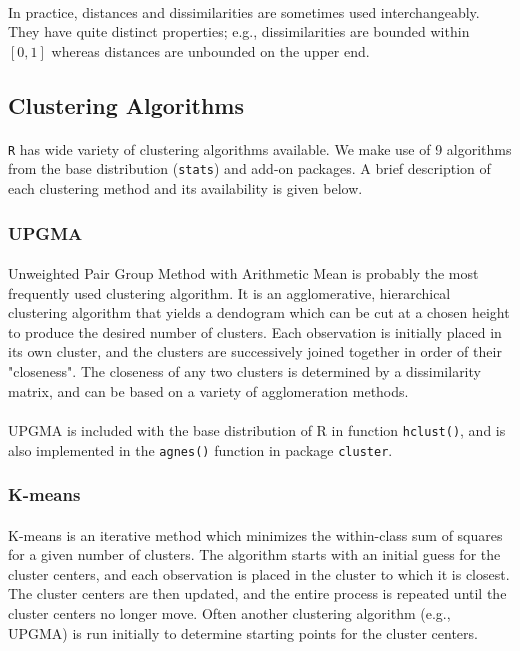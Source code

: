 \documentclass[10pt]{article}\usepackage[]{graphicx}\usepackage[]{color}
\begin{document}
\paragraph{}
In practice, distances and dissimilarities are sometimes used interchangeably. 
They have quite distinct properties; e.g., dissimilarities are bounded within 
$[0,1]$ whereas distances are unbounded on the upper end.



\subsection{Clustering Algorithms}
\paragraph{}
\texttt{R} has wide variety of clustering algorithms available. We make use of 9 
algorithms from the base distribution (\texttt{stats}) and add-on packages. 
A brief description of each clustering method and its availability is given below.

\subsubsection{UPGMA}
\paragraph{}
Unweighted Pair Group Method with Arithmetic Mean is probably the most
frequently used clustering algorithm. It is
an agglomerative, hierarchical clustering algorithm that yields a dendogram
which can be cut at a chosen height to produce the desired number of clusters.
Each observation is initially placed in its own cluster, and the clusters
are successively joined together in order of their "closeness". The closeness
of any two clusters is determined by a dissimilarity matrix, and can be
based on a variety of agglomeration methods. 
\paragraph{}
UPGMA is included with the base distribution of R in function 
\texttt{hclust()}, and is also implemented in the \texttt{agnes()}
function in package \texttt{cluster}.


\subsubsection{K-means}
\paragraph{}
K-means is an iterative method which minimizes the within-class sum of
squares for a given number of clusters. The
algorithm starts with an initial guess for the cluster centers, and each 
observation is placed in the cluster to which it is closest. The cluster centers
are then updated, and the entire process is repeated until the cluster centers
no longer move. Often another clustering algorithm (e.g., UPGMA) is
run initially to determine starting points for the cluster centers. 
\end{document}
